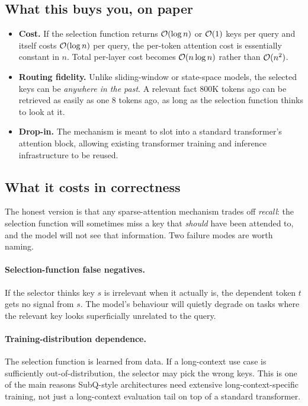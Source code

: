 \subsection{What this buys you, on paper}

\begin{itemize}
\item \textbf{Cost.} If the selection function returns $\mathcal{O}(\log n)$ or
$\mathcal{O}(1)$ keys per query and itself costs $\mathcal{O}(\log n)$ per query, the
per-token attention cost is essentially constant in $n$. Total per-layer
cost becomes $\mathcal{O}(n \log n)$ rather than $\mathcal{O}(n^2)$.
\item \textbf{Routing fidelity.} Unlike sliding-window or state-space
models, the selected keys can be \emph{anywhere in the past}. A relevant
fact 800K tokens ago can be retrieved as easily as one 8 tokens ago, as
long as the selection function thinks to look at it.
\item \textbf{Drop-in.} The mechanism is meant to slot into a standard
transformer's attention block, allowing existing transformer training and
inference infrastructure to be reused.
\end{itemize}

\subsection{What it costs in correctness}

The honest version is that any sparse-attention mechanism trades off
\emph{recall}: the selection function will sometimes miss a key that
\emph{should} have been attended to, and the model will not see that
information. Two failure modes are worth naming.

\paragraph{Selection-function false negatives.} If the selector thinks key
\(s\) is irrelevant when it actually is, the dependent token \(t\) gets
no signal from \(s\). The model's behaviour will quietly degrade on tasks
where the relevant key looks superficially unrelated to the query.

\paragraph{Training-distribution dependence.} The selection function is
learned from data. If a long-context use case is sufficiently
out-of-distribution, the selector may pick the wrong keys. This is one
of the main reasons SubQ-style architectures need extensive
long-context-specific training, not just a long-context evaluation tail
on top of a standard transformer.

